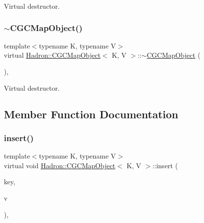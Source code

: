 Virtual destructor. 

\mbox{\label{classHadron_1_1CGCMapObject_aee79d26f143bad748680b674763b831f}} 
\subsubsection{\texorpdfstring{$\sim$CGCMapObject()}{~CGCMapObject()}\hspace{0.1cm}{\footnotesize\ttfamily [2/2]}}
{\footnotesize\ttfamily template$<$typename K, typename V$>$ \\
virtual \mbox{\hyperlink{classHadron_1_1CGCMapObject}{Hadron\+::\+C\+G\+C\+Map\+Object}}$<$ K, V $>$\+::$\sim$\mbox{\hyperlink{classHadron_1_1CGCMapObject}{C\+G\+C\+Map\+Object}} (\begin{DoxyParamCaption}{ }\end{DoxyParamCaption})\hspace{0.3cm}{\ttfamily [inline]}, {\ttfamily [virtual]}}



Virtual destructor. 



\subsection{Member Function Documentation}
\mbox{\label{classHadron_1_1CGCMapObject_a334a88a21755a64719b1081190d2bde2}} 
\subsubsection{\texorpdfstring{insert()}{insert()}\hspace{0.1cm}{\footnotesize\ttfamily [1/2]}}
{\footnotesize\ttfamily template$<$typename K, typename V$>$ \\
virtual void \mbox{\hyperlink{classHadron_1_1CGCMapObject}{Hadron\+::\+C\+G\+C\+Map\+Object}}$<$ K, V $>$\+::insert (\begin{DoxyParamCaption}\item[{const \mbox{\hyperlink{structHadron_1_1CGCKeyType}{C\+G\+C\+Key\+Type}}$<$ K $>$ \&}]{key,  }\item[{const V \&}]{v }\end{DoxyParamCaption})\hspace{0.3cm}{\ttfamily [inline]}, {\ttfamily [virtual]}}

